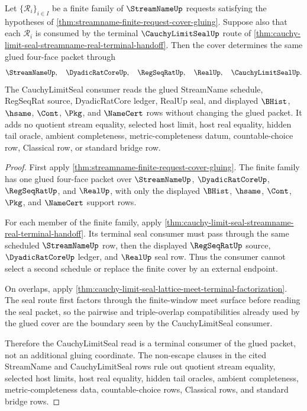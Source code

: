 \begin{theorem}
\label{thm:streamname-finite-request-cover-cauchy-limit-seal-stability}
Let $\{\mathcal{R}_i\}_{i\in I}$ be a finite family of $\StreamNameUp$
requests satisfying the hypotheses of
\autoref{thm:streamname-finite-request-cover-gluing}. Suppose also that each
$\mathcal{R}_i$ is consumed by the terminal $\CauchyLimitSealUp$ route of
\autoref{thm:cauchy-limit-seal-streamname-real-terminal-handoff}. Then the
cover determines the same glued four-face packet through
$$
\StreamNameUp,\quad \DyadicRatCoreUp,\quad \RegSeqRatUp,\quad \RealUp,
\quad \CauchyLimitSealUp.
$$
The CauchyLimitSeal consumer reads the glued StreamName schedule, RegSeqRat
source, DyadicRatCore ledger, RealUp seal, and displayed $\BHist$, $\hsame$,
$\Cont$, $\Pkg$, and $\NameCert$ rows without changing the glued packet. It
adds no quotient stream equality, selected host limit, host real equality,
hidden tail oracle, ambient completeness, metric-completeness datum,
countable-choice row, Classical row, or standard bridge row.
\end{theorem}
\begin{proof}
First apply
\autoref{thm:streamname-finite-request-cover-gluing}. The finite family has
one glued four-face packet over $\StreamNameUp$, $\DyadicRatCoreUp$,
$\RegSeqRatUp$, and $\RealUp$, with only the displayed $\BHist$, $\hsame$,
$\Cont$, $\Pkg$, and $\NameCert$ support rows.

For each member of the finite family, apply
\autoref{thm:cauchy-limit-seal-streamname-real-terminal-handoff}. Its terminal
seal consumer must pass through the same scheduled $\StreamNameUp$ row, then
the displayed $\RegSeqRatUp$ source, $\DyadicRatCoreUp$ ledger, and $\RealUp$
seal row. Thus the consumer cannot select a second schedule or replace the
finite cover by an external endpoint.

On overlaps, apply
\autoref{thm:cauchy-limit-seal-lattice-meet-terminal-factorization}. The seal
route first factors through the finite-window meet surface before reading the
seal packet, so the pairwise and triple-overlap compatibilities already used
by the glued cover are the boundary seen by the CauchyLimitSeal consumer.

Therefore the CauchyLimitSeal read is a terminal consumer of the glued packet,
not an additional gluing coordinate. The non-escape clauses in the cited
StreamName and CauchyLimitSeal rows rule out quotient stream equality,
selected host limits, host real equality, hidden tail oracles, ambient
completeness, metric-completeness data, countable-choice rows, Classical rows,
and standard bridge rows.
\end{proof}

